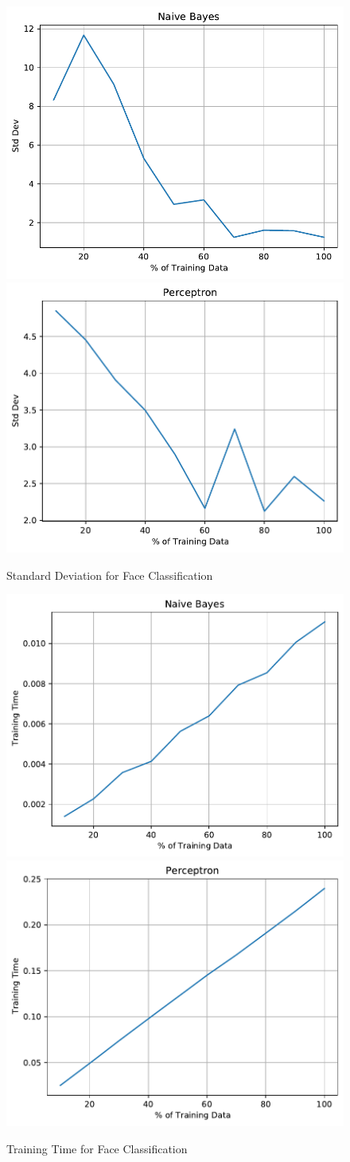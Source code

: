 \documentclass{article}
\begin{document}
  \begin{figure}[H]
  \includegraphics[width=0.45\linewidth]{figures/Naive Bayes_stddev_FACE.pdf}\hfill
  \includegraphics[width=0.45\linewidth]{figures/Perceptron_stddev_FACE.pdf}\hfill
  \caption{Standard Deviation for Face Classification}
  \end{figure}
  \begin{figure}[H]
  \includegraphics[width=0.45\linewidth]{figures/Naive Bayes_time_FACE.pdf}\hfill
  \includegraphics[width=0.45\linewidth]{figures/Perceptron_time_FACE.pdf}\hfill
  \caption{Training Time for Face Classification}
  \end{figure}
\end{document}
